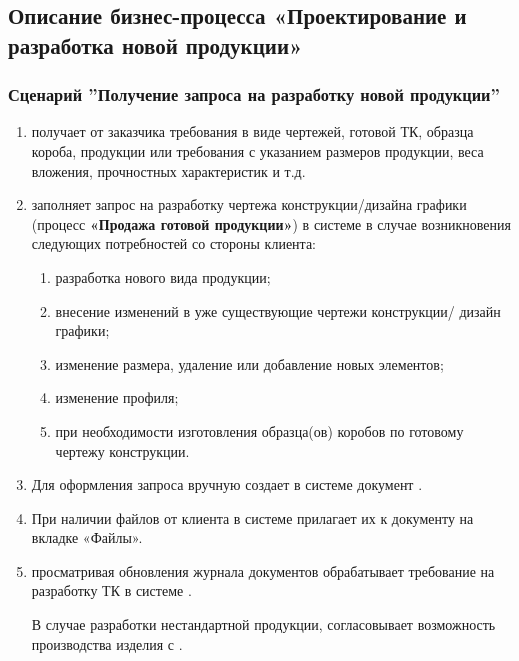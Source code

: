 
\subsection{Описание бизнес-процесса «Проектирование и разработка новой продукции»}

\subsubsection{Сценарий ''Получение запроса на разработку новой продукции''}
\label{bp:pm_1}

\begin{enumerate}

\item \manager получает от заказчика требования в виде чертежей, готовой ТК, образца короба, продукции или требования с указанием размеров продукции, веса вложения, прочностных характеристик и т.д.
\item \manager заполняет запрос на разработку чертежа конструкции/дизайна графики (процесс \textbf{«Продажа готовой продукции»}) в системе \gofro в случае возникновения следующих потребностей со стороны клиента:
    
    \begin{enumerate}
        \item разработка нового вида продукции;
        \item внесение изменений в уже существующие чертежи конструкции/ дизайн графики;
\item изменение размера, удаление или добавление новых элементов;
\item изменение профиля;
\item при необходимости изготовления образца(ов) коробов по готовому чертежу конструкции.
    \end{enumerate}


\item	Для оформления запроса \manager вручную создает в системе \gofro документ  .
\item	При наличии файлов от клиента \manager в системе \gofro прилагает их к документу  на вкладке «Файлы».

\item \tehnolog просматривая обновления журнала документов  обрабатывает требование на разработку ТК в системе \gofro. 

В случае разработки нестандартной продукции, \tehnolog согласовывает возможность производства изделия с \processengineer.


\end{enumerate}
